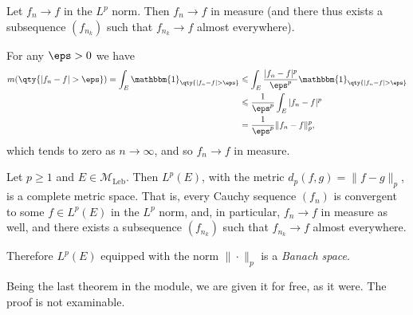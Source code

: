 \documentclass{maths}
\newcommand{\mleb}{\mathcal{M}_{\text{Leb}}}
\newcommand{\ind}{\mathbbm{1}}
\begin{document}
\begin{prop}
    Let $f_n\to f$ in the $L^p$ norm.
    Then $f_n\to f$ in measure (and there thus exists a subsequence $(f_{n_k})$ such that $f_{n_k}\to f$ almost everywhere).
\end{prop}

\begin{prf}
    For any $\eps>0$ we have
    \begin{align*}
        m(\qty{|f_n-f|>\eps}) =
        \int_E \ind_{\qty{|f_n-f|>\eps}}
        &\leqslant \int_E \frac{|f_n-f|^p}{\eps^p} \ind_{\qty{|f_n-f|>\eps}}\\
        &\leqslant \frac{1}{\eps^p} \int_E |f_n-f|^p\\
        &= \frac{1}{\eps^p} \|f_n - f\|_p^p,
    \end{align*}
    which tends to zero as $n\to\infty$, and so $f_n\to f$ in measure.
\end{prf}

\begin{thm}
    Let $p\geqslant1$ and $E\in\mleb$.
    Then $L^p(E)$, with the metric $d_p(f,g)=\|f-g\|_p$, is a complete metric space.
    That is, every Cauchy sequence $(f_n)$ is convergent to some $f\in L^p(E)$ in the $L^p$ norm, and, in particular, $f_n\to f$ in measure as well, and there exists a subsequence $(f_{n_k})$ such that $f_{n_k}\to f$ almost everywhere.

    Therefore $L^p(E)$ equipped with the norm $\|\cdot\|_p$ is a \emph{Banach space}.
\end{thm}

\begin{prf}
    Being the last theorem in the module, we are given it for free, as it were.
    The proof is not examinable.
\end{prf}
\end{document}
